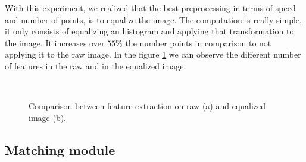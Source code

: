 With this experiment, we realized that the best preprocessing in terms of speed and number of points, is to equalize the image. The computation is really simple, it only consists of equalizing an histogram and applying that transformation to the image. It increases over $ 55 \%$ the number points in comparison to not applying it to the raw image. In the figure \ref{experiTrack4} we can observe the different number of features in the raw and in the equalized image.

\begin{figure}[H]
		
\centering

\\
\caption{Comparison between feature extraction on raw (a) and equalized image (b).}
\label{experiTrack4}
\end{figure}


\subsection{Matching module}

